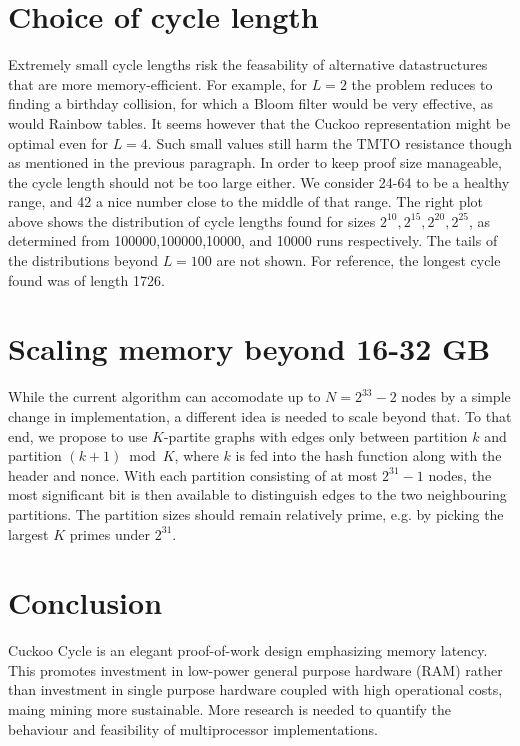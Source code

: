 \documentclass[11pt, oneside]{article}
\begin{document}
\section{Choice of cycle length}
Extremely small cycle lengths risk the feasability of alternative datastructures that
are more memory-efficient. For example, for $L=2$ the problem reduces to finding a birthday collision,
for which a Bloom filter would be very effective, as would Rainbow tables.
It seems however that the Cuckoo representation might be optimal even for $L=4$.
Such small values still harm the TMTO resistance though as mentioned in the previous paragraph.
In order to keep proof size manageable, the cycle length should not be too large either.
We consider 24-64 to be a healthy range, and 42 a nice number close to the middle of that range.
The right plot above shows the distribution of cycle lengths found for sizes $2^{10},2^{15},2^{20},2^{25}$,
as determined from 100000,100000,10000, and 10000 runs respectively. The tails of the distributions
beyond $L=100$ are not shown. For reference, the longest cycle found was of length 1726.

\section{Scaling memory beyond 16-32 GB}
While the current algorithm can accomodate up to $N=2^{33}-2$ nodes by a simple change
in implementation, a different idea is needed to scale beyond that.
To that end, we propose to use $K$-partite graphs with edges only between partition $k$ and partition $(k+1) \bmod K$,
where $k$ is fed into the hash function along with the header and nonce. With each partition consisting of at most
$2^31-1$ nodes, the most significant bit is then available to distinguish edges to the two neighbouring partitions.
The partition sizes should remain relatively prime, e.g. by picking the largest $K$ primes under $2^{31}$.

\section{Conclusion}
Cuckoo Cycle is an elegant proof-of-work design emphasizing memory latency.
This promotes investment in low-power general purpose hardware (RAM) rather than investment
in single purpose hardware coupled with high operational costs, maing mining more sustainable.
More research is needed to quantify the behaviour and feasibility of multiprocessor implementations.



\end{document}

